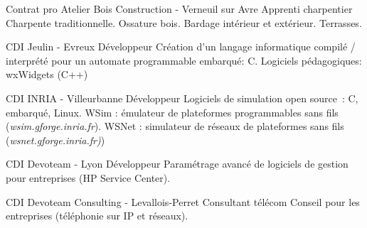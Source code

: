 \documentclass[10pt]{article} %
\begin{document}
\begin{paracol}{2}
  {Contrat pro} %
  {Atelier Bois Construction - Verneuil sur Avre} %
  {Apprenti charpentier} %
  {Charpente traditionnelle. Ossature bois. Bardage intérieur et extérieur. Terrasses.}  %


  {CDI} %
  {Jeulin - Evreux} %
  {Développeur} %
  {Création d'un langage informatique compilé / interprété pour un automate programmable embarqué: C. Logiciels pédagogiques: wxWidgets (C++)} %

  {CDI} %
  {INRIA - Villeurbanne} %
  {Développeur} %
  {Logiciels de simulation open source : C, embarqué, Linux. WSim : émulateur de plateformes programmables sans fils \small{(\textit{wsim.gforge.inria.fr})}. WSNet : simulateur de réseaux de plateformes sans fils \small{(\textit{wsnet.gforge.inria.fr)})}} %

  {CDI} %
  {Devoteam - Lyon} %
  {Développeur} %
  {Paramétrage avancé de logiciels de gestion pour entreprises (HP Service Center).} %

  {CDI} %
  {Devoteam Consulting - Levallois-Perret} %
  {Consultant télécom} %
  {Conseil pour les entreprises (téléphonie sur IP et réseaux).} %


  \vspace{-\baselineskip}\medskip %

  \switchcolumn %



\end{paracol}
\end{document}
